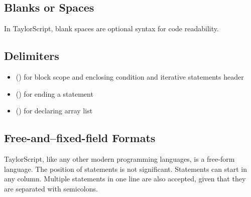 \subsection{Blanks or Spaces}
In TaylorScript, blank spaces are optional syntax for code readability.

\subsection{Delimiters}
\begin{itemize}
\item {} (\cd{[]}) for block scope and enclosing condition and iterative statements header
\item {} (\cd{;}) for ending a statement
\item {} (\cd{\{\}}) for declaring array list
\end{itemize}

\subsection{Free-and--fixed-field Formats}
TaylorScript, like any other modern programming languages, is a free-form language. The position of statements is not significant. Statements can start in any column. Multiple statements in one line are also accepted, given that they are separated with semicolons.